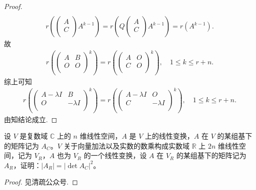 \documentclass[../../main.tex]{subfiles}%
\begin{document}
\begin{proof}
\begin{align*}
\end{align*}
\begin{align*}
r\left( \left( \begin{array}{c}
A\\
C\\
\end{array} \right) A^{k-1} \right) =r\left( Q\left( \begin{array}{c}
A\\
C\\
\end{array} \right) A^{k-1} \right) =r\left( A^{k-1} \right) .
\end{align*}
故
\begin{align*}
r\left( \left( \begin{matrix}
A&	B\\
O&	O\\
\end{matrix} \right) ^k \right) =r\left( \left( \begin{matrix}
A&	O\\
C&	O\\
\end{matrix} \right) ^k \right) ,\quad 1\leqslant k\leqslant r+n.
\end{align*}
综上可知
\begin{align*}
r\left( \left( \begin{matrix}
A-\lambda I&	B\\
O&	-\lambda I\\
\end{matrix} \right) ^k \right) =r\left( \left( \begin{matrix}
A-\lambda I&	O\\
C&	-\lambda I\\
\end{matrix} \right) ^k \right) ,\quad 1\leqslant k\leqslant r+n.
\end{align*}
由知结论成立.
\end{proof}

\begin{proposition}[复矩阵行列式模长平方等于其实化后实矩阵的行列式]\label{proposition:复矩阵行列式模长平方等于其实化后实矩阵的行列式}
设 \( V \) 是复数域 \( \mathbb{C} \) 上的 \( n \) 维线性空间，\( A\) 是 \( V \) 上的线性变换，\( A \) 在 \( V \) 的某组基下的矩阵记为 \( A_{C} \)。\( V \) 关于向量加法以及实数的数乘构成实数域 \( \mathbb{R} \) 上 \( 2n \) 维线性空间，记为 \( V_{R} \)，\( A \) 也为 \( V_{R} \) 的一个线性变换，设 \( A\) 在 \( V_{R} \) 的某组基下的矩阵记为 \( A_{R} \)，证明：\( |A_{R}| = |\det A_{C}|^{2} \)。
\end{proposition}
\begin{proof}
见清疏公众号.
\end{proof}
\end{document}
